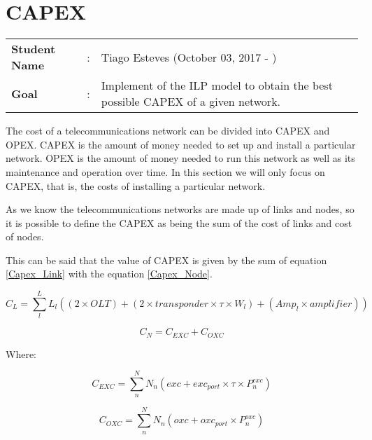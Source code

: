\clearpage

\section{CAPEX}
\begin{tcolorbox}	
\begin{tabular}{p{2.75cm} p{0.2cm} p{10.5cm}} 	
\textbf{Student Name}  &:& Tiago Esteves    (October 03, 2017 - )\\
\textbf{Goal}          &:& Implement of the ILP model to obtain the best possible CAPEX of a given network.
\end{tabular}
\end{tcolorbox}
\vspace{11pt}

The cost of a telecommunications network can be divided into CAPEX and OPEX.
CAPEX is the amount of money needed to set up and install a particular network.
OPEX is the amount of money needed to run this network as well as its maintenance and operation over time.
In this section we will only focus on CAPEX, that is, the costs of installing a particular network.

As we know the telecommunications networks are made up of links and nodes, so it is possible to define the CAPEX as being the sum of the cost of links and cost of nodes.

This can be said that the value of CAPEX is given by the sum of equation \ref{Capex_Link} with the equation \ref{Capex_Node}.

\begin{equation}
C_L = \sum_{l}^L L_{l} \left( (2 \times OLT) + (2 \times transponder \times \tau \times W_{l}) +  (Amp_{l} \times amplifier) \right)
\label{Capex_Link}
\end{equation}

\begin{equation}
C_N = C_{EXC} + C_{OXC}
\label{Capex_Node}
\end{equation}

Where:

\begin{equation}
C_{EXC} = \sum_{n}^N N_{n} \left(exc + exc_{port} \times \tau \times P^{exc}_{n} \right)
\label{Capex_Node_EXC}
\end{equation}

\begin{equation}
C_{OXC} = \sum_{n}^N N_{n} \left(oxc + oxc_{port} \times P^{oxc}_{n} \right)
\label{Capex_Node_OXC}
\end{equation}


